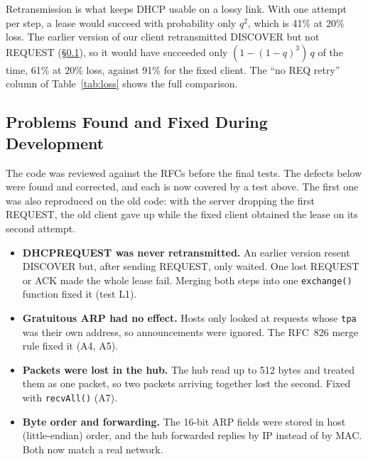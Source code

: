 \documentclass[11pt]{article}
\begin{document}
Retransmission is what keeps DHCP usable on a lossy link. With one attempt per step, a
lease would succeed with probability only $q^2$, which is 41\% at 20\% loss. The earlier
version of our client retransmitted DISCOVER but not REQUEST (\S\ref{sec:fixes}), so it
would have succeeded only $(1-(1-q)^3)\,q$ of the time, 61\% at 20\% loss, against 91\%
for the fixed client. The ``no REQ retry'' column of Table~\ref{tab:loss} shows the full
comparison.

\subsection{Problems Found and Fixed During Development}
\label{sec:fixes}
The code was reviewed against the RFCs before the final tests. The defects below were
found and corrected, and each is now covered by a test above. The first one was also
reproduced on the old code: with the server dropping the first REQUEST, the old client
gave up while the fixed client obtained the lease on its second attempt.
\begin{itemize}[leftmargin=1.6em]
  \item \textbf{DHCPREQUEST was never retransmitted.} An earlier version resent DISCOVER
  but, after sending REQUEST, only waited. One lost REQUEST or ACK made the whole lease
  fail. Merging both steps into one \texttt{exchange()} function fixed it (test L1).
  \item \textbf{Gratuitous ARP had no effect.} Hosts only looked at requests whose
  \texttt{tpa} was their own address, so announcements were ignored. The RFC~826 merge
  rule fixed it (A4, A5).
  \item \textbf{Packets were lost in the hub.} The hub read up to 512 bytes and treated
  them as one packet, so two packets arriving together lost the second. Fixed with
  \texttt{recvAll()} (A7).
  \item \textbf{Byte order and forwarding.} The 16-bit ARP fields were stored in host
  (little-endian) order, and the hub forwarded replies by IP instead of by MAC. Both now
  match a real network.
\end{itemize}
\end{document}
